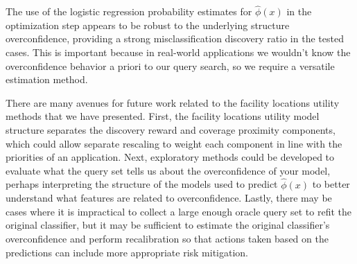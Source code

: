 \documentclass[letterpaper]{article} %
\begin{document}
The use of the logistic regression probability estimates for $\hat{\phi}(x)$ in the optimization step appears to be robust to the underlying structure overconfidence, providing a strong misclassification discovery ratio in the tested cases. This is important because in real-world applications we wouldn’t know the overconfidence behavior a priori to our query search, so we require a versatile estimation method. 

There are many avenues for future work related to the facility locations utility methods that we have presented. First, the facility locations utility model structure separates the discovery reward and coverage proximity components, which could allow separate rescaling to weight each component in line with the priorities of an application. Next, exploratory methods could be developed to evaluate what the query set tells us about the overconfidence of your model, perhaps interpreting the structure of the models used to predict $\hat{\phi}(x)$ to better understand what features are related to overconfidence. Lastly, there may be cases where it is impractical to collect a large enough oracle query set to refit the original classifier, but it may be sufficient to estimate the original classifier’s overconfidence and perform recalibration so that actions taken based on the predictions can include more appropriate risk mitigation. 


\newpage



\end{document}

